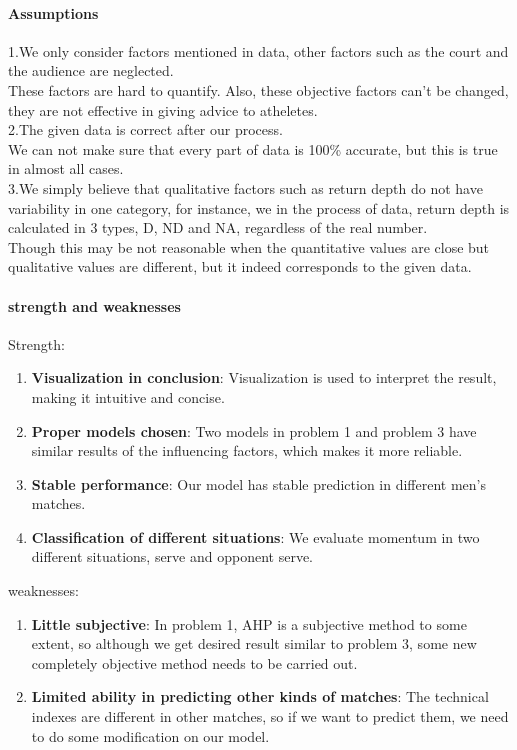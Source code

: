 \documentclass[12pt, a4paper, oneside]{article}
\theoremstyle{break}
\begin{document}
\paragraph{Assumptions}
1.We only consider factors mentioned in data, other factors such as the court and the audience are neglected.\\
These factors are hard to quantify. Also, these objective factors can't be changed, they are not effective in giving advice to atheletes.\\
2.The given data is correct after our process.\\
We can not make sure that every part of data is 100\% accurate, but this is true in almost all cases.\\
3.We simply believe that qualitative factors such as return depth do not have variability in one category, for instance, we 
in the process of data, return depth is calculated in 3 types, D, ND and NA, regardless of the real number.\\
Though this may be not reasonable when the quantitative values are close but qualitative values are different, but it indeed corresponds to the given data.


\paragraph{strength and weaknesses}
Strength:
\begin{enumerate}
    \item {\bf Visualization in conclusion}: Visualization is used to interpret the result, making it intuitive and concise.
    \item {\bf Proper models chosen}: Two models in problem 1 and problem 3 have similar results of the influencing factors, which makes it more reliable.
    \item {\bf Stable performance}: Our model has stable prediction in different men's matches.
    \item {\bf Classification of different situations}: We evaluate momentum in two different situations, serve and opponent serve.
\end{enumerate}
weaknesses:
\begin{enumerate}
    \item {\bf Little subjective}: In problem 1, AHP is a subjective method to some extent, so although we get desired result similar to problem 3,
    some new completely objective method needs to be carried out.
    \item {\bf Limited ability in predicting other kinds of matches}: The technical indexes are different in other matches, so if we want to predict them, 
    we need to do some modification on our model.
\end{enumerate}
\end{document}

